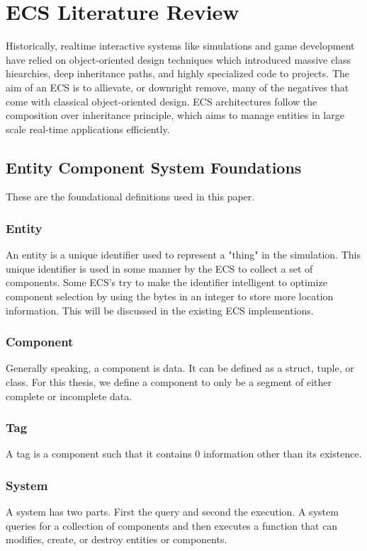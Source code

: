 \section{ECS Literature Review}
\label{chap:1}

Historically, realtime interactive systems like simulations and game development have relied on object-oriented design techniques which introduced massive class hiearchies, deep inheritance paths, and highly specialized code to projects. The aim of an ECS is to allievate, or downright remove, many of the negatives that come with classical object-oriented design. ECS architectures follow the composition over inheritance principle, which aims to manage entities in large scale real-time applications efficiently. \cite{Haerkoenen2019} 

\subsection{Entity Component System Foundations}
These are the foundational definitions used in this paper.

\subsubsection{Entity}
    An entity is a unique identifier used to represent a "thing" in the simulation. This unique identifier is used in some manner by the ECS to collect a set of components. Some ECS's try to make the identifier intelligent to optimize component selection by using the bytes in an integer to store more location information. This will be discussed in the existing ECS implementions.

\subsubsection{Component}
    Generally speaking, a component is data. It can be defined as a struct, tuple, or class. For this thesis, we define a component to only be a segment of either complete or incomplete data.

\subsubsection{Tag}
    A tag is a component such that it contains 0 information other than its existence.

\subsubsection{System}
    A system has two parts. First the query and second the execution. A system queries for a collection of components and then executes a function that can modifies, create, or destroy entities or components.

